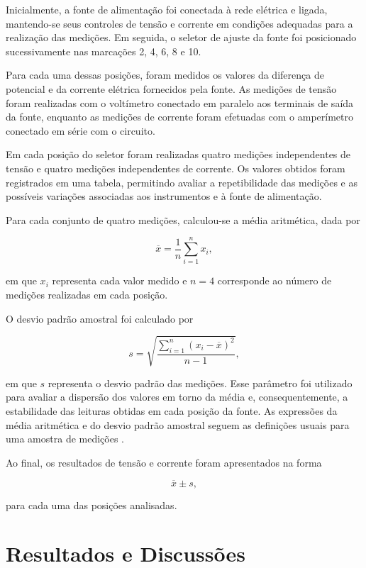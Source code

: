 \documentclass[a4paper,12pt]{article}
\begin{document}
Inicialmente, a fonte de alimentação foi conectada à rede elétrica e ligada, mantendo-se seus controles de tensão e corrente em condições adequadas para a realização das medições. Em seguida, o seletor de ajuste da fonte foi posicionado sucessivamente nas marcações 2, 4, 6, 8 e 10.

Para cada uma dessas posições, foram medidos os valores da diferença de potencial e da corrente elétrica fornecidos pela fonte. As medições de tensão foram realizadas com o voltímetro conectado em paralelo aos terminais de saída da fonte, enquanto as medições de corrente foram efetuadas com o amperímetro conectado em série com o circuito.

Em cada posição do seletor foram realizadas quatro medições independentes de tensão e quatro medições independentes de corrente. Os valores obtidos foram registrados em uma tabela, permitindo avaliar a repetibilidade das medições e as possíveis variações associadas aos instrumentos e à fonte de alimentação.

Para cada conjunto de quatro medições, calculou-se a média aritmética, dada por

\begin{equation}
\overline{x}
=
\frac{1}{n}
\sum_{i=1}^{n} x_i,
\label{eq:media_medidas}
\end{equation}

em que $x_i$ representa cada valor medido e $n=4$ corresponde ao número de medições realizadas em cada posição.

O desvio padrão amostral foi calculado por

\begin{equation}
s
=
\sqrt{
\frac{
\displaystyle\sum_{i=1}^{n}
\left(x_i-\overline{x}\right)^2
}{n-1}
},
\label{eq:desvio_padrao_medidas}
\end{equation}

em que $s$ representa o desvio padrão das medições. Esse parâmetro foi utilizado para avaliar a dispersão dos valores em torno da média e, consequentemente, a estabilidade das leituras obtidas em cada posição da fonte. As expressões da média aritmética e do desvio padrão amostral seguem as definições usuais para uma amostra de medições \parencite[seção 7.2.2]{nist2002}.

Ao final, os resultados de tensão e corrente foram apresentados na forma

\[
\overline{x} \pm s,
\]

para cada uma das posições analisadas.

\section{Resultados e Discussões}
\end{document}
